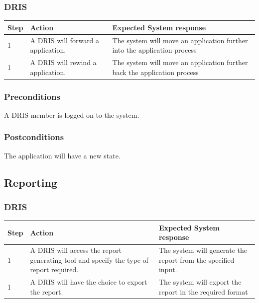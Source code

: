 \documentclass[12pt]{article}
\begin{document}
\subsubsection{DRIS}

\begin{center}
\begin{tabular}{|l|p{6cm}|p{8cm}|}
\hline
Step & Action & Expected System response \\
\hline
1 & A DRIS will forward a application. & The system will move an application further into the application process \\
\hline

1 & A DRIS will rewind a application. & The system will move an application further back the application process \\
\hline
\end{tabular}
\end{center}

\subsubsection*{Preconditions}
A DRIS member is logged on to the system.

\subsubsection*{Postconditions}
The application will have a new state.

\subsection{Reporting}

\subsubsection{DRIS}

\begin{center}
\begin{tabular}{|l|p{6cm}|p{8cm}|}
\hline
Step & Action & Expected System response \\
\hline
1 & A DRIS will access the report generating tool and specify the type of report required. & The system will generate the report from the specified input. \\
\hline

1 & A DRIS will have the choice to export the report. & The system will export the report in the required format\\
\hline
\end{tabular}
\end{center}
\end{document}
